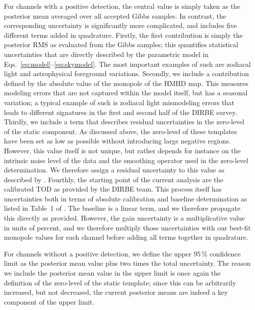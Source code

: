 \documentclass{aa}
\begin{document}
For channels with a positive detection, the central value is simply
taken as the posterior mean averaged over all accepted Gibbs
samples. In contrast, the corresponding uncertainty is significantly
more complicated, and includes five different terms added in
quadrature. Firstly, the first contribution is simply the posterior
RMS as evaluated from the Gibbs samples; this quantifies statistical
uncertainties that are directly described by the parametric model in
Eqs.~\eqref{eq:model}--\eqref{eq:skymodel}. The most important
examples of such are zodiacal light and astrophysical foreground
variations. Secondly, we include a contribution defined by the
absolute value of the monopole of the HMHD map. This measures
modeling errors that are not captured within the model itself, but
has a seasonal variation; a typical example of such is zodiacal light
mismodeling errors that leads to different signatures in the first
and second half of the DIRBE survey. Thirdly, we include a term that
describes residual uncertainties in the zero-level of the static
component. As discussed above, the zero-level of these templates have
been set as low as possible without introducing large negative
regions. However, this value itself is not unique, but rather depends
for instance on the intrinsic noise level of the data and the
smoothing operator used in the zero-level determination. We therefore
assign a residual uncertainty to this value as described by
\citet{CG02_01}. Fourthly, the starting point of the current analysis
are the calibrated TOD as provided by the DIRBE team. This process
itself has uncertainties both in terms of absolute calibration and
baseline determination as listed in Table~1 of \citet{hauser1998}. The
baseline is a linear term, and we therefore propagate this directly as
provided. However, the gain uncertainty is a multiplicative value in
units of percent, and we therefore multiply those uncertainties with
our best-fit monopole values for each channel before adding
all terms together in quadrature.


For channels without a positive detection, we define the upper 95\,\%
confidence limit as the posterior mean value plus two times the total
uncertainty. The reason we include the posterior mean value in the
upper limit is once again the definition of the zero-level of the
static template; since this can be arbitrarily increased, but not
decreased, the current posterior means are indeed a key component of
the upper limit.
\end{document}
